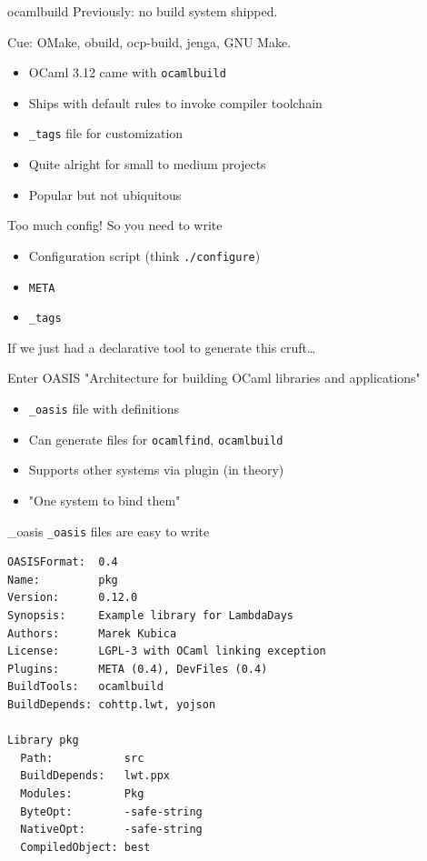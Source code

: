 \documentclass{beamer}
\begin{document}
\begin{frame}{ocamlbuild}
  Previously: no build system shipped.

  Cue: OMake, obuild, ocp-build, jenga, GNU Make.

  \begin{itemize}
    \item OCaml 3.12 came with \texttt{ocamlbuild}
    \item Ships with default rules to invoke compiler toolchain
    \item \texttt{\_tags} file for customization
    \item Quite alright for small to medium projects
    \item Popular but not ubiquitous
  \end{itemize}
\end{frame}

\begin{frame}{Too much config!}
  So you need to write

  \begin{itemize}
    \item Configuration script (think \texttt{./configure})
    \item \texttt{META}
    \item \texttt{\_tags}
  \end{itemize}

  If we just had a declarative tool to generate this cruft…
\end{frame}

\begin{frame}{Enter OASIS}
  "Architecture for building OCaml libraries and applications"

  \begin{itemize}
    \item \texttt{\_oasis} file with definitions
    \item Can generate files for \texttt{ocamlfind}, \texttt{ocamlbuild}
    \item Supports other systems via plugin (in theory)
    \item "One system to bind them"
  \end{itemize}
\end{frame}

\begin{frame}[fragile]{\_oasis}
  \texttt{\_oasis} files are easy to write
  \begin{verbatim}
OASISFormat:  0.4
Name:         pkg
Version:      0.12.0
Synopsis:     Example library for LambdaDays
Authors:      Marek Kubica
License:      LGPL-3 with OCaml linking exception
Plugins:      META (0.4), DevFiles (0.4)
BuildTools:   ocamlbuild
BuildDepends: cohttp.lwt, yojson

Library pkg
  Path:           src
  BuildDepends:   lwt.ppx
  Modules:        Pkg
  ByteOpt:        -safe-string
  NativeOpt:      -safe-string
  CompiledObject: best
  \end{verbatim}
\end{frame}
\end{document}
